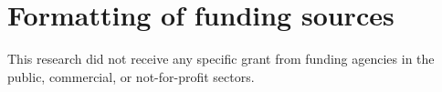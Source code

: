 \documentclass[preprint,5p,sort&compress,times,UTF8]{elsarticle}                                             %
\begin{document}
\section*{Formatting of funding sources}
This research did not receive any specific grant from funding agencies in the public, commercial, or not-for-profit sectors.


\end{document}
